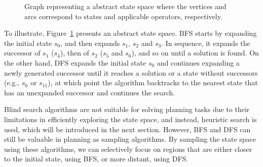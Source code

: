 \begin{figure}[ht]
    \caption[Graph representing a abstract state space.]{Graph representing a abstract state space where the vertices and arcs correspond to states and applicable operators, respectively.}
    \label{fig:statespace}
    \addvspace{\baselineskip}
    \centering
\end{figure}

To illustrate, Figure~\ref{fig:statespace} presents an abstract state space. BFS starts by expanding the initial state $s_0$, and then expands $s_1$, $s_2$ and $s_3$. In sequence, it expands the successor of $s_1$ ($s_4$), then of $s_2$ ($s_5$ and $s_6$), and so on until a solution is found. On the other hand, DFS expands the initial state $s_0$ and continues expanding a newly generated successor until it reaches a solution or a state without successors (e.g., $s_6$ or $s_{11}$), at which point the algorithm backtracks to the nearest state that has an unexpanded successor and continues the search.

Blind search algorithms are not suitable for solving planning tasks due to their limitations in efficiently exploring the state space, and instead, heuristic search is used, which will be introduced in the next section. However, BFS and DFS can still be valuable in planning as sampling algorithms. By sampling the state space using these algorithms, we can selectively focus on regions that are either closer to the initial state, using BFS, or more distant, using DFS.

